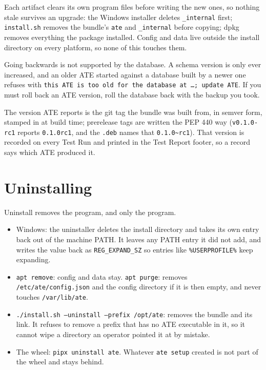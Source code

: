 Each artifact clears its own program files before writing the new ones, so nothing stale survives an
upgrade: the Windows installer deletes \texttt{\_internal} first; \texttt{install.sh} removes the
bundle's \texttt{ate} and \texttt{\_internal} before copying; dpkg removes everything the package
installed. Config and data live outside the install directory on every platform, so none of this
touches them.

Going backwards is not supported by the database. A schema version is only ever increased, and an
older ATE started against a database built by a newer one refuses with \texttt{this ATE is too old
for the database at \dots; update ATE}. If you must roll back an ATE version, roll the database back
with the backup you took.

The version ATE reports is the git tag the bundle was built from, in semver form, stamped in at
build time; prerelease tags are written the PEP 440 way (\texttt{v0.1.0-rc1} reports
\texttt{0.1.0rc1}, and the \texttt{.deb} names that \texttt{0.1.0\textasciitilde rc1}). That version
is recorded on every Test Run and printed in the Test Report footer, so a record says which ATE
produced it.

\section{Uninstalling}

Uninstall removes the program, and only the program.

\begin{itemize}
  \item Windows: the uninstaller deletes the install directory and takes its own entry back out of
    the machine PATH. It leaves any PATH entry it did not add, and writes the value back as
    \texttt{REG\_EXPAND\_SZ} so entries like \texttt{\%USERPROFILE\%} keep expanding.
  \item \texttt{apt remove}: config and data stay. \texttt{apt purge}: removes
    \texttt{/etc/ate/config.json} and the config directory if it is then empty, and never touches
    \texttt{/var/lib/ate}.
  \item \texttt{./install.sh --uninstall --prefix /opt/ate}: removes the bundle and its link. It
    refuses to remove a prefix that has no ATE executable in it, so it cannot wipe a directory an
    operator pointed it at by mistake.
  \item The wheel: \texttt{pipx uninstall ate}. Whatever \texttt{ate setup} created is not part of
    the wheel and stays behind.
\end{itemize}

